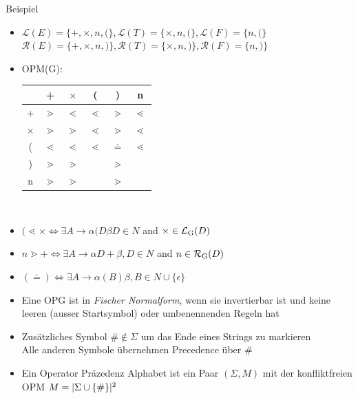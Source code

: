 \documentclass[
10pt,
pantone315, 	%
]{beamer}
\begin{document}
\begin{frame}[t] {Beispiel}
	\begin{itemize}[<+->]
	\item
	$\mathcal{L}(E)=\{+, \times, n, (\}, \mathcal{L}(T)=\{\times, n, (\}, \mathcal{L}(F)=\{n,(\}$
	\\
	$\mathcal{R}(E)=\{+, \times, n, )\}, \mathcal{R}(T)=\{\times, n, )\}, \mathcal{R}(F)=\{n,)\}$
	\item
	OPM(G):\\
	\begin{tabular}{c | c c c c c}
	    & + & $\times$ & ( & ) & n \\ \hline
	  + & $\gtrdot$ & $\lessdot$ & $\lessdot$ & $\gtrdot$  &$\lessdot$ \\
	  $\times$ & $\gtrdot$ & $\gtrdot$ & $\lessdot$ & $\gtrdot$ & $\lessdot$ \\
	  ( & $\lessdot$ & $\lessdot$ & $\lessdot$ & $\doteq$ & $\lessdot$\\
	  ) & $\gtrdot$ & $\gtrdot$ &  & $\gtrdot$ & \\
	  n & $\gtrdot$ & $\gtrdot$ &  & $\gtrdot$ & \\
	\end{tabular}
	\\
	\item
	$( \lessdot \times \Leftrightarrow \exists A \rightarrow \alpha (D \beta D \in N $ and $ \times \in
		\mathcal{L}\textsubscript{G}(D)$
	\item
	$ n \gtrdot + \Leftrightarrow \exists A \rightarrow \alpha D+ \beta , D \in N $ and $ n \in
		\mathcal{R}\textsubscript{G}(D)$
	\item
	$ ( \doteq ) \Leftrightarrow \exists A \rightarrow \alpha (B) \beta , 
		B \in N \cup \{ \epsilon \}$
	\end{itemize}
\end{frame}

\begin{frame}[t]{\subsecname}
	\begin{itemize}[<+->]
	\item
	Eine OPG ist in \textit{Fischer Normalform}, wenn sie invertierbar ist und keine leeren (ausser Startsymbol) oder umbenennenden Regeln hat
	\item
	Zusätzliches Symbol $\# \notin \Sigma$ um das Ende eines Strings zu markieren\\
	Alle anderen Symbole übernehmen Precedence über $\#$
	\item
	Ein Operator Präzedenz Alphabet ist ein Paar $(\Sigma, M)$ mit der konfliktfreien OPM $M = | \Sigma \cup \{ \# \} | \textsuperscript{2}$	
	\end{itemize}
\end{frame}
\end{document}
